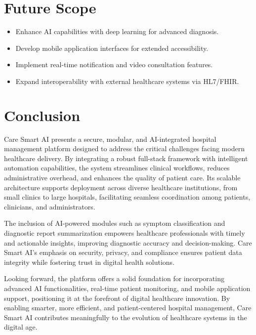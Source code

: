 \documentclass[conference]{IEEEtran}
\begin{document}
\section{Future Scope}

\begin{itemize}
    \item Enhance AI capabilities with deep learning for advanced diagnosis.
    \item Develop mobile application interfaces for extended accessibility.
    \item Implement real-time notification and video consultation features.
    \item Expand interoperability with external healthcare systems via HL7/FHIR.
\end{itemize}

\section{Conclusion}

Care Smart AI presents a secure, modular, and AI-integrated hospital management platform designed to address the critical challenges facing modern healthcare delivery. By integrating a robust full-stack framework with intelligent automation capabilities, the system streamlines clinical workflows, reduces administrative overhead, and enhances the quality of patient care. Its scalable architecture supports deployment across diverse healthcare institutions, from small clinics to large hospitals, facilitating seamless coordination among patients, clinicians, and administrators.

The inclusion of AI-powered modules such as symptom classification and diagnostic report summarization empowers healthcare professionals with timely and actionable insights, improving diagnostic accuracy and decision-making. Care Smart AI's emphasis on security, privacy, and compliance ensures patient data integrity while fostering trust in digital health solutions.

Looking forward, the platform offers a solid foundation for incorporating advanced AI functionalities, real-time patient monitoring, and mobile application support, positioning it at the forefront of digital healthcare innovation. By enabling smarter, more efficient, and patient-centered hospital management, Care Smart AI contributes meaningfully to the evolution of healthcare systems in the digital age.
\end{document}
